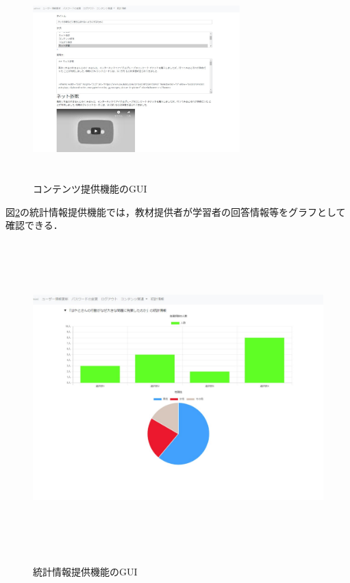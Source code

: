 \begin{figure}[htbp]
    \begin{center}
        \includegraphics[width=8cm,height=7cm,keepaspectratio]{create_content-crop.pdf}\\
    \end{center}
    \caption{コンテンツ提供機能のGUI}
    \label{teikyou}
\end{figure}

\newpage
図\ref{toukei}の統計情報提供機能では，教材提供者が学習者の回答情報等をグラフとして確認できる．
\begin{figure}[htbp]
    \begin{center}
        \includegraphics[width=13cm,height=12cm,keepaspectratio]{toukei-crop.pdf}\\
    \end{center}
    \caption{統計情報提供機能のGUI}
    \label{toukei}
\end{figure}


